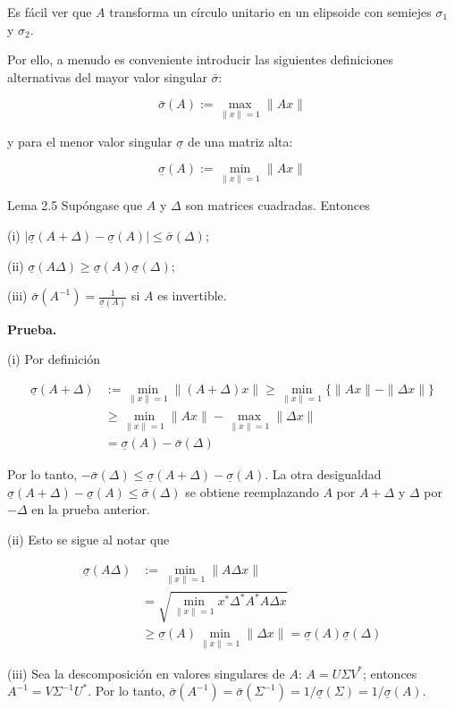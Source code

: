 Es fácil ver que $A$ transforma un círculo unitario en un elipsoide con semiejes $\sigma_{1}$ y $\sigma_{2}$.

Por ello, a menudo es conveniente introducir las siguientes definiciones alternativas del mayor valor singular $\bar{\sigma}$:

$$
\bar{\sigma}(A):=\max _{\|x\|=1}\|A x\|
$$

y para el menor valor singular $\underline{\sigma}$ de una matriz alta:

$$
\underline{\sigma}(A):=\min _{\|x\|=1}\|A x\|
$$

Lema 2.5 Supóngase que $A$ y $\Delta$ son matrices cuadradas. Entonces

(i) $|\underline{\sigma}(A+\Delta)-\underline{\sigma}(A)| \leq \bar{\sigma}(\Delta)$;

(ii) $\underline{\sigma}(A \Delta) \geq \underline{\sigma}(A) \underline{\sigma}(\Delta)$;

(iii) $\bar{\sigma}\left(A^{-1}\right)=\frac{1}{\underline{\sigma}(A)}$ si $A$ es invertible.

\textbf{Prueba.}

(i) Por definición

$$
\begin{aligned}
\underline{\sigma}(A+\Delta) & :=\min _{\|x\|=1}\|(A+\Delta) x\| \geq \min _{\|x\|=1}\{\|A x\|-\|\Delta x\|\} \\
& \geq \min _{\|x\|=1}\|A x\|-\max _{\|x\|=1}\|\Delta x\| \\
& =\underline{\sigma}(A)-\bar{\sigma}(\Delta)
\end{aligned}
$$

Por lo tanto, $-\bar{\sigma}(\Delta) \leq \underline{\sigma}(A+\Delta)-\underline{\sigma}(A)$. La otra desigualdad $\underline{\sigma}(A+\Delta)-\underline{\sigma}(A) \leq \bar{\sigma}(\Delta)$ se obtiene reemplazando $A$ por $A+\Delta$ y $\Delta$ por $-\Delta$ en la prueba anterior.

(ii) Esto se sigue al notar que

$$
\begin{aligned}
\underline{\sigma}(A \Delta) & :=\min _{\|x\|=1}\|A \Delta x\| \\
& =\sqrt{\min _{\|x\|=1} x^{*} \Delta^{*} A^{*} A \Delta x} \\
& \geq \underline{\sigma}(A) \min _{\|x\|=1}\|\Delta x\|=\underline{\sigma}(A) \underline{\sigma}(\Delta)
\end{aligned}
$$

(iii) Sea la descomposición en valores singulares de $A$: $A=U \Sigma V^{*}$; entonces $A^{-1}=V \Sigma^{-1} U^{*}$. Por lo tanto, $\bar{\sigma}\left(A^{-1}\right)=\bar{\sigma}\left(\Sigma^{-1}\right)=1 / \underline{\sigma}(\Sigma)=1 / \underline{\sigma}(A)$.

